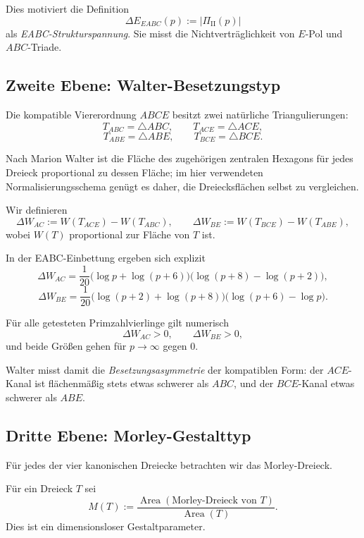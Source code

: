 Dies motiviert die Definition
\[
\Delta E_{EABC}(p):=|\Pi_{\mathrm{II}}(p)|
\]
als \emph{EABC-Strukturspannung}. Sie misst die Nichtverträglichkeit von $E$-Pol und $ABC$-Triade.

\subsection{Zweite Ebene: Walter-Besetzungstyp}

Die kompatible Viererordnung $ABCE$ besitzt zwei natürliche Triangulierungen:
\[
T_{ABC}=\triangle ABC,\qquad T_{ACE}=\triangle ACE,
\]
\[
T_{ABE}=\triangle ABE,\qquad T_{BCE}=\triangle BCE.
\]

Nach Marion Walter ist die Fläche des zugehörigen zentralen Hexagons für jedes Dreieck proportional zu dessen Fläche; im hier verwendeten Normalisierungsschema genügt es daher, die Dreiecksflächen selbst zu vergleichen.

\begin{definition}
Wir definieren
\[
\Delta W_{AC}:=W(T_{ACE})-W(T_{ABC}),
\qquad
\Delta W_{BE}:=W(T_{BCE})-W(T_{ABE}),
\]
wobei $W(T)$ proportional zur Fläche von $T$ ist.
\end{definition}

In der EABC-Einbettung ergeben sich explizit
\[
\Delta W_{AC}
= \frac{1}{20}\bigl(\log p+\log(p+6)\bigr)\bigl(\log(p+8)-\log(p+2)\bigr),
\]
\[
\Delta W_{BE}
= \frac{1}{20}\bigl(\log(p+2)+\log(p+8)\bigr)\bigl(\log(p+6)-\log p\bigr).
\]

\begin{proposition}
Für alle getesteten Primzahlvierlinge gilt numerisch
\[
\Delta W_{AC}>0,
\qquad
\Delta W_{BE}>0,
\]
und beide Größen gehen für $p\to\infty$ gegen $0$.
\end{proposition}

Walter misst damit die \emph{Besetzungsasymmetrie} der kompatiblen Form: der $ACE$-Kanal ist flächenmäßig stets etwas schwerer als $ABC$, und der $BCE$-Kanal etwas schwerer als $ABE$.

\subsection{Dritte Ebene: Morley-Gestalttyp}

Für jedes der vier kanonischen Dreiecke betrachten wir das Morley-Dreieck.

\begin{definition}
Für ein Dreieck $T$ sei
\[
M(T):=\frac{\operatorname{Area}(\text{Morley-Dreieck von }T)}{\operatorname{Area}(T)}.
\]
Dies ist ein dimensionsloser Gestaltparameter.
\end{definition}

